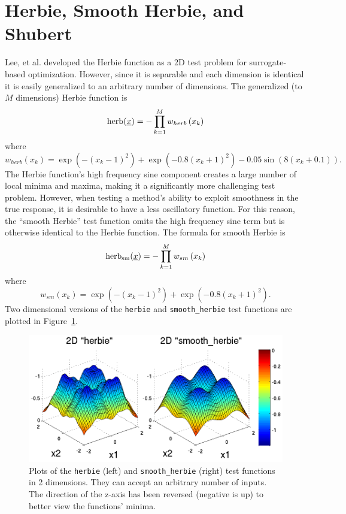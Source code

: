 \section{Herbie, Smooth Herbie, and Shubert}
Lee, et al. \cite{herbiefunc} developed the Herbie function as a 2D
test problem for surrogate-based optimization. However, since it is
separable and each dimension is identical it is easily generalized to
an arbitrary number of dimensions. The generalized (to $M$
dimensions) Herbie function is
\begin{displaymath}
{\rm herb}(\underline{x})=-\prod_{k=1}^M w_{herb}\left(x_k\right)
\end{displaymath}
where 
\begin{displaymath}
w_{herb}\left(x_k\right)=\exp(-(x_k-1)^2)+\exp(-0.8(x_k+1)^2)-0.05\sin\left(8\left(x_k+0.1\right)\right).
\end{displaymath}
The Herbie function's high frequency sine component creates a large
number of local minima and maxima, making it a significantly more
challenging test problem. However, when testing a method's ability to
exploit smoothness in the true response, it is desirable to have a
less oscillatory function. For this reason, the ``smooth Herbie''
test function omits the high frequency sine term but is otherwise
identical to the Herbie function. The formula for smooth Herbie is
\begin{displaymath}
{\rm herb_{sm}}(\underline{x})=-\prod_{k=1}^M w_{sm}\left(x_k\right)
\end{displaymath}
where 
\begin{displaymath}
w_{sm}\left(x_k\right)=\exp(-(x_k-1)^2)+\exp(-0.8(x_k+1)^2).
\end{displaymath}
Two dimensional versions of the \texttt{herbie} and \texttt{smooth\_herbie} 
test functions are plotted in Figure~\ref{fig:2D_herbie__smooth_herbie}.
\begin{figure}[hbp]
  \centering
  \centerline{\includegraphics[scale=1.0]{images/DAK5pt2_2D__herbie__smooth_herbie}}
  \caption{Plots of the \texttt{herbie} (left) and
           \texttt{smooth\_herbie} (right) test functions in 2
           dimensions. They can accept an arbitrary number of
           inputs. The direction of the z-axis has been reversed 
           (negative is up) to better view the functions' minima.}
  \label{fig:2D_herbie__smooth_herbie}
\end{figure}

